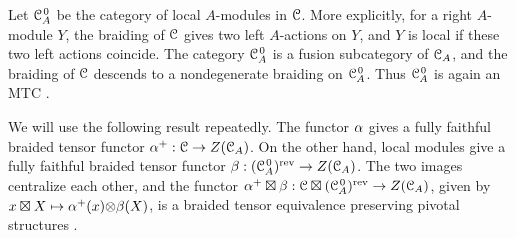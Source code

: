 \documentclass{amsart}
\begin{document}
Let ${{\EuScript{C}}_A^{\hspace{1pt}0}}$ be the category of local $A$-modules in ${\EuScript{C}}$. More explicitly, for a
right $A$-module $Y$, the braiding of ${\EuScript{C}}$ gives two left $A$-actions on
$Y$, and $Y$ is local if these two left actions coincide. The category
${{\EuScript{C}}_A^{\hspace{1pt}0}}$ is a fusion subcategory of ${{\EuScript{C}}_A}$, and the braiding of ${\EuScript{C}}$ descends
to a nondegenerate braiding on ${{\EuScript{C}}_A^{\hspace{1pt}0}}$. Thus ${{\EuScript{C}}_A^{\hspace{1pt}0}}$ is again an MTC
\cite[Thm. 4.5]{KO02}.

We will use the following result repeatedly. The functor ${\alpha}$ gives a fully
faithful braided tensor functor ${\alpha}^+:{\EuScript{C}}\to Z({{\EuScript{C}}_A})$. On the other hand,
local modules give a fully faithful braided tensor functor
$\beta:({{\EuScript{C}}_A^{\hspace{1pt}0}})^{\operatorname{rev}}\to Z({{\EuScript{C}}_A})$. The two images centralize each other, and the
functor ${\alpha}^+\boxtimes \beta:{\EuScript{C}}\boxtimes({{\EuScript{C}}_A^{\hspace{1pt}0}})^{\operatorname{rev}}\to Z({{\EuScript{C}}_A})$, given by
$x\boxtimes X\mapsto {\alpha}^+(x){\otimes} \beta(X)$, is a braided tensor equivalence
preserving pivotal structures \cite[Cor. 3.28, Cor. 3.30]{DMNO}.
\end{document}
